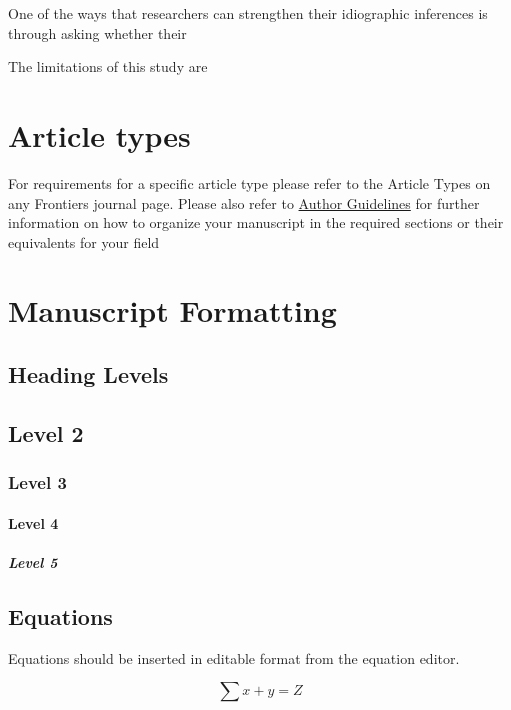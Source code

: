 \documentclass[utf8]{FrontiersinVancouver}
\begin{document}
One of the ways that researchers can strengthen their idiographic inferences is through asking whether their 

The limitations of this study are 
\section{Article types}

For requirements for a specific article type please refer to the Article Types on any Frontiers journal page. Please also refer to  \href{http://home.frontiersin.org/about/author-guidelines#Sections}{Author Guidelines} for further information on how to organize your manuscript in the required sections or their equivalents for your field


\section{Manuscript Formatting}

\subsection{Heading Levels}


\subsection{Level 2}
\subsubsection{Level 3}
\paragraph{Level 4}
\subparagraph{Level 5}

\subsection{Equations}
Equations should be inserted in editable format from the equation editor.

\begin{equation}
\sum x+ y =Z\label{eq:01}
\end{equation}
\end{document}
